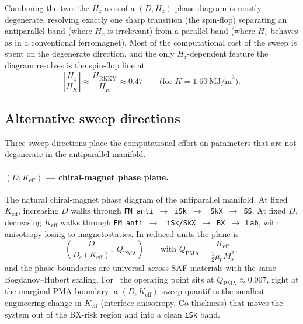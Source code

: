 \documentclass[11pt,a4paper]{article}
\newcommand{\Keff}{K_{\text{eff}}}
\newcommand{\Ms}{M_s}
\newcommand{\HK}{H_K}
\newcommand{\Dc}{D_c}
\newcommand{\Qpma}{Q_{\text{PMA}}}
\newcommand{\HRKKY}{H_{\text{RKKY}}}
\begin{document}
\medskip\noindent
Combining the two: the $H_z$ axis of a $(D, H_z)$ phase
diagram is mostly degenerate, resolving exactly one sharp
transition (the spin-flop) separating an antiparallel
band (where $H_z$ is irrelevant) from a parallel band
(where $H_z$ behaves as in a conventional ferromagnet).
Most of the computational cost of the sweep is spent on
the degenerate direction, and the only $H_z$-dependent
feature the diagram resolves is the spin-flop line at
%
\begin{equation}
\left|\frac{H_z}{\HK}\right| \approx
    \frac{\HRKKY}{\HK} \approx 0.47
\qquad \text{(for } K = 1.60\ \text{MJ/m}^3\text{).}
\end{equation}

\subsection{Alternative sweep directions}

Three sweep directions place the computational effort on
parameters that are not degenerate in the antiparallel
manifold.

\paragraph{$(D, \Keff)$ --- chiral-magnet phase plane.}
The natural chiral-magnet phase diagram of the
antiparallel manifold. At fixed $\Keff$, increasing $D$
walks through \texttt{FM\_anti}~$\to$~\texttt{iSk}~$\to$~
\texttt{SkX}~$\to$~\texttt{SS}. At fixed $D$, decreasing
$\Keff$ walks through \texttt{FM\_anti}~$\to$~
\texttt{iSk/SkX}~$\to$~\texttt{BX}~$\to$~\texttt{Lab}, with
anisotropy losing to magnetostatics. In reduced units the
plane is
%
\begin{equation}
\left( \frac{D}{\Dc(\Keff)},\;
       \Qpma \right)
\qquad \text{with } \Qpma =
    \frac{\Keff}{\tfrac{1}{2}\mu_0 \Ms^2},
\end{equation}
%
and the phase boundaries are universal across SAF
materials with the same Bogdanov--Hubert scaling.
For~\cite{pham2024} the operating point sits at
$\Qpma \approx 0.007$, right at the marginal-PMA
boundary; a $(D, \Keff)$ sweep quantifies the smallest
engineering change in $\Keff$ (interface anisotropy, Co
thickness) that moves the system out of the BX-risk
region and into a clean \texttt{iSk} band.
\end{document}
